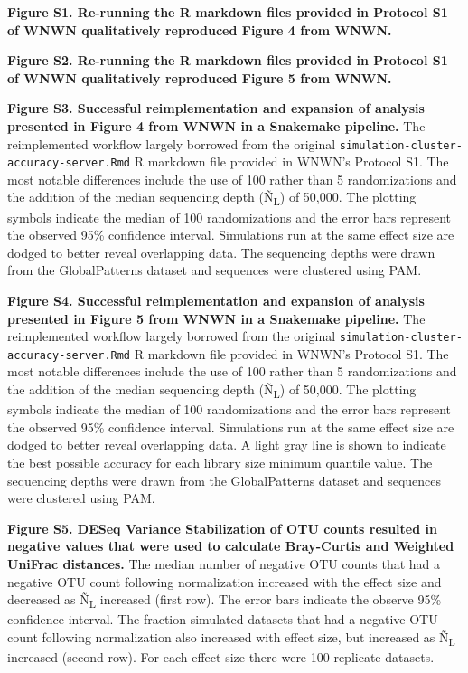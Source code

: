 \documentclass[
]{article}
\begin{document}
\newpage

\textbf{Figure S1. Re-running the R markdown files provided in Protocol
S1 of WNWN qualitatively reproduced Figure 4 from WNWN.}

\textbf{Figure S2. Re-running the R markdown files provided in Protocol
S1 of WNWN qualitatively reproduced Figure 5 from WNWN.}

\textbf{Figure S3. Successful reimplementation and expansion of analysis
presented in Figure 4 from WNWN in a Snakemake pipeline.} The
reimplemented workflow largely borrowed from the original
\texttt{simulation-cluster-accuracy-server.Rmd} R markdown file provided
in WNWN's Protocol S1. The most notable differences include the use of
100 rather than 5 randomizations and the addition of the median
sequencing depth (Ñ\textsubscript{L}) of 50,000. The plotting symbols
indicate the median of 100 randomizations and the error bars represent
the observed 95\% confidence interval. Simulations run at the same
effect size are dodged to better reveal overlapping data. The sequencing
depths were drawn from the GlobalPatterns dataset and sequences were
clustered using PAM.

\textbf{Figure S4. Successful reimplementation and expansion of analysis
presented in Figure 5 from WNWN in a Snakemake pipeline.} The
reimplemented workflow largely borrowed from the original
\texttt{simulation-cluster-accuracy-server.Rmd} R markdown file provided
in WNWN's Protocol S1. The most notable differences include the use of
100 rather than 5 randomizations and the addition of the median
sequencing depth (Ñ\textsubscript{L}) of 50,000. The plotting symbols
indicate the median of 100 randomizations and the error bars represent
the observed 95\% confidence interval. Simulations run at the same
effect size are dodged to better reveal overlapping data. A light gray
line is shown to indicate the best possible accuracy for each library
size minimum quantile value. The sequencing depths were drawn from the
GlobalPatterns dataset and sequences were clustered using PAM.

\textbf{Figure S5. DESeq Variance Stabilization of OTU counts resulted
in negative values that were used to calculate Bray-Curtis and Weighted
UniFrac distances.} The median number of negative OTU counts that had a
negative OTU count following normalization increased with the effect
size and decreased as Ñ\textsubscript{L} increased (first row). The
error bars indicate the observe 95\% confidence interval. The fraction
simulated datasets that had a negative OTU count following normalization
also increased with effect size, but increased as Ñ\textsubscript{L}
increased (second row). For each effect size there were 100 replicate
datasets.
\end{document}
